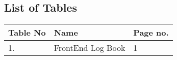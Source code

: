 \documentclass[12pt]{article}
\begin{document}
\begin{center}
    \section*{List of Tables}
\end{center}
\vspace{1.5cm}
\begin{center}
    
\begin{tabular}{|p{0.4in}|p{0.4in}|p{2.5in}|p{1.2in}|} \hline 
\multicolumn{2}{|p{1in}|}{Table No } & Name  & \textbf{Page no. } \\ \hline 
\multicolumn{2}{|p{1in}|}{1. } & FrontEnd Log Book & 1  \\ \hline 
   
\end{tabular}
\end{center}

\pagebreak
\newpage
\end{document}
